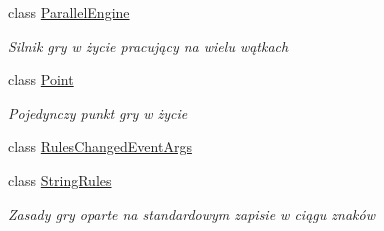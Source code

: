 \begin{DoxyCompactItemize}
class \hyperlink{class_convay_1_1_core_1_1_parallel_engine}{Parallel\+Engine}
\begin{DoxyCompactList}\small\item\em Silnik gry w życie pracujący na wielu wątkach \end{DoxyCompactList}\item 
class \hyperlink{class_convay_1_1_core_1_1_point}{Point}
\begin{DoxyCompactList}\small\item\em Pojedynczy punkt gry w życie \end{DoxyCompactList}\item 
class \hyperlink{class_convay_1_1_core_1_1_rules_changed_event_args}{Rules\+Changed\+Event\+Args}
\item 
class \hyperlink{class_convay_1_1_core_1_1_string_rules}{String\+Rules}
\begin{DoxyCompactList}\small\item\em Zasady gry oparte na standardowym zapisie w ciągu znaków \end{DoxyCompactList}\end{DoxyCompactItemize}
